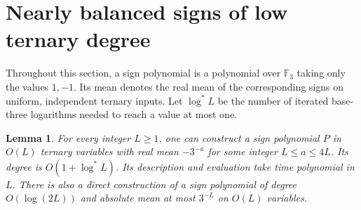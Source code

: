 \documentclass[11pt]{article}
\newtheorem{lemma}[theorem]{Lemma}
\begin{document}
\section{Nearly balanced signs of low ternary degree}
\label{sec:multi-coin}

Throughout this section, a sign polynomial is a polynomial over
$\mathbb F_3$ taking only the values $1,-1$. Its mean denotes the real
mean of the corresponding signs on uniform, independent ternary inputs.
Let $\log^* L$ be the number of iterated base-three logarithms needed to
reach a value at most one.
\begin{lemma}\label{lem:multi-coin}
For every integer $L\ge1$, one can construct a sign polynomial $P$
in $O(L)$ ternary variables with real mean $-3^{-a}$ for some integer
$L\le a\le 4L$. Its degree is $O(1+\log^* L)$.
Its description and evaluation take time polynomial in $L$.
There is also a direct construction of a sign polynomial of degree
$O(\log(2L))$ and absolute mean at most $3^{-L}$ on $O(L)$ variables.
\end{lemma}
\end{document}
